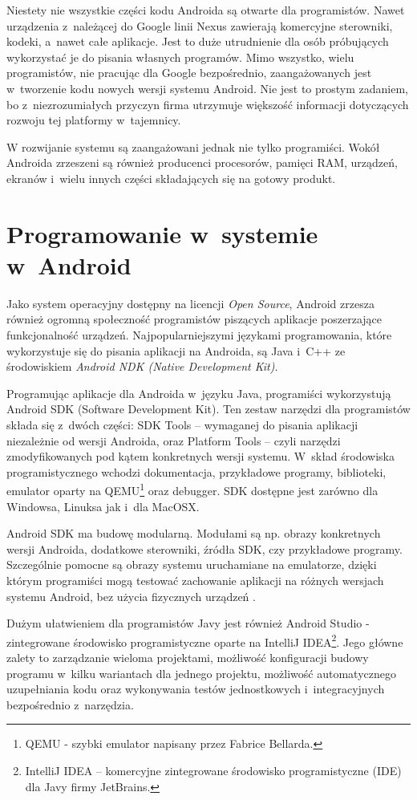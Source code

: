 Niestety nie wszystkie części kodu Androida są otwarte dla programistów. Nawet urządzenia z~należącej do Google linii Nexus zawierają komercyjne sterowniki, kodeki, a~nawet całe aplikacje. Jest to duże utrudnienie dla osób próbujących wykorzystać je do pisania własnych programów. Mimo wszystko, wielu programistów, nie pracując dla Google bezpośrednio, zaangażowanych jest w~tworzenie kodu nowych wersji systemu Android. Nie jest to prostym zadaniem, bo z~niezrozumiałych przyczyn firma utrzymuje większość informacji dotyczących rozwoju tej platformy w~tajemnicy.

W rozwijanie systemu są zaangażowani jednak nie tylko programiści. Wokół Androida zrzeszeni są również producenci procesorów, pamięci RAM, urządzeń, ekranów i~wielu innych części składających się na gotowy produkt.

\section{Programowanie w~systemie w~Android}
Jako system operacyjny dostępny na licencji \textit{Open Source}, Android zrzesza również ogromną społeczność programistów piszących aplikacje poszerzające funkcjonalność urządzeń. Najpopularniejszymi językami programowania, które wykorzystuje się do pisania aplikacji na Androida, są Java i~C++ ze środowiskiem \textit{Android NDK (Native Development Kit)}. 

Programując aplikacje dla Androida w~języku Java, programiści wykorzystują Android SDK (Software Development Kit). Ten zestaw narzędzi dla programistów składa się z~dwóch części: SDK Tools – wymaganej do pisania aplikacji niezależnie od wersji Androida, oraz Platform Tools – czyli narzędzi zmodyfikowanych pod kątem konkretnych wersji systemu. W~skład środowiska programistycznego wchodzi dokumentacja, przykładowe programy, biblioteki, emulator oparty na QEMU\footnote{QEMU - szybki emulator napisany przez Fabrice Bellarda.} oraz debugger. SDK dostępne jest zarówno dla Windowsa, Linuksa jak i~dla MacOSX.

Android SDK ma budowę modularną. Modułami są np. obrazy konkretnych wersji Androida, dodatkowe sterowniki, źródła SDK, czy przykładowe programy. Szczególnie pomocne są obrazy systemu uruchamiane na emulatorze, dzięki którym programiści mogą  testować zachowanie aplikacji na różnych wersjach systemu Android, bez użycia fizycznych urządzeń \cite{website:wikipedia}.

Dużym ułatwieniem dla programistów Javy jest również Android Studio - zintegrowane środowisko programistyczne oparte na IntelliJ IDEA\footnote{IntelliJ IDEA – komercyjne zintegrowane środowisko programistyczne (IDE) dla Javy firmy JetBrains.}. Jego główne zalety to zarządzanie wieloma projektami, możliwość konfiguracji budowy programu w~kilku wariantach dla jednego projektu, możliwość automatycznego uzupełniania kodu oraz wykonywania testów jednostkowych i~integracyjnych bezpośrednio z~narzędzia.

